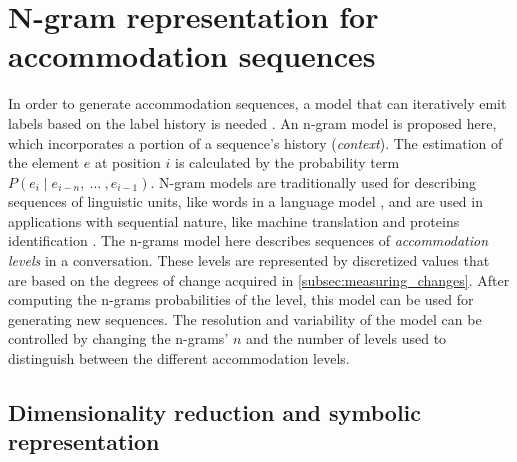 \section{N-gram representation for accommodation sequences}
\label{sec:accommodation_as_a_lm}

In order to generate accommodation sequences, a model that can iteratively emit labels based on the label history is needed \citep[in contrast to, e.g., models with the Markov property, as in][]{Bellman1957markovian}. 
An n-gram model is proposed here, which incorporates a portion of a sequence's history (\emph{context}).
The estimation of the element $e$ at position $i$ is calculated by the probability term $P(e_i \mid e_{i-n},\ \ldots\ , e_{i-1})$.
N-gram models are traditionally used for describing sequences of linguistic units, like words in a language model \citep[e.g.,][]{Niesler1996variable}, and are used in applications with sequential nature, like machine translation \citep{Marino2006ngram} and proteins identification \citep{Xu2015identification}.
The n-grams model here describes sequences of \emph{accommodation levels} in a conversation.
These levels are represented by discretized values that are based on the degrees of change acquired in \cref{subsec:measuring_changes}.
After computing the n-grams probabilities of the level, this model can be used for generating new sequences.
The resolution and variability of the model can be controlled by changing the n-grams' $n$ and the number of levels used to distinguish between the different accommodation levels.

\subsection{Dimensionality reduction and symbolic representation}
\label{subsec:dim_reduction_and_symbolic_rep}


